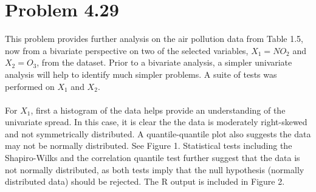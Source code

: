 \newpage
\section*{Problem 4.29}
This problem provides further analysis on the air pollution data from Table 1.5, now from a bivariate perspective on two of the selected variables, $X_1 = NO_2$ and $X_2 = O_3$, from the dataset. Prior to a bivariate analysis, a simpler univariate analysis will help to identify much simpler problems. A suite of tests was performed on $X_1$ and $X_2$. 
\\
\\For $X_1$, first a histogram of the data helps provide an understanding of the univariate spread. In this case, it is clear the the data is moderately right-skewed and not symmetrically distributed. A quantile-quantile plot also suggests the data may not be normally distributed. See Figure 1. Statistical tests including the Shapiro-Wilks and the correlation quantile test further suggest that the data is not normally distributed, as both tests imply that the null hypothesis (normally distributed data) should be rejected. The R output is included in Figure 2.

